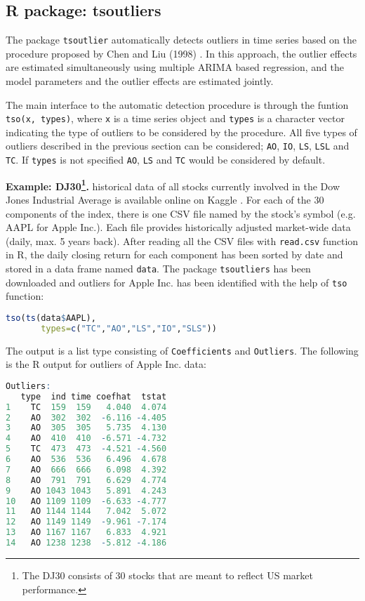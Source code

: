 \subsection{R package: tsoutliers} The package \verb|tsoutlier| automatically detects outliers in time series based on the procedure proposed by Chen and Liu (1998) \cite{chenliu}. In this approach, the outlier effects are estimated simultaneously using multiple ARIMA based regression, and the model parameters and the outlier effects are estimated jointly. \par The main interface to the automatic detection procedure is through the funtion \verb|tso(x, types)|, where \verb|x| is a time series object and \verb|types| is a character vector indicating the type of outliers to be considered by the procedure. All five types of outliers described in the previous section can be considered; \verb|AO|, \verb|IO|, \verb|LS|, \verb|LSL| and \verb|TC|. If \verb|types| is not specified \verb|AO|, \verb|LS| and \verb|TC| would be considered by default. \par \textbf{Example: DJ30\footnote{The DJ30 consists of 30 stocks that are meant to reflect US market performance.}.} historical data of all stocks currently involved in the Dow Jones Industrial Average is available online on Kaggle \cite{dj30}. For each of the 30 components of the index, there is one CSV file named by the stock's symbol (e.g. AAPL for Apple Inc.). Each file provides historically adjusted market-wide data (daily, max. 5 years back). After reading all the CSV files with \verb|read.csv| function in R, the daily closing return for each component has been sorted by date and stored in a data frame named \verb|data|. The package \verb|tsoutliers| has been downloaded and outliers for Apple Inc. has been identified with the help of \verb|tso| function:
\begin{lstlisting}[language=R]
tso(ts(data$AAPL), 
       types=c("TC","AO","LS","IO","SLS"))
\end{lstlisting}
The output is a list type consisting of \verb|Coefficients| and \verb|Outliers|. The following is the R output for outliers of Apple Inc. data:
\begin{lstlisting}[language=R]
Outliers:
   type  ind time coefhat  tstat
1    TC  159  159   4.040  4.074
2    AO  302  302  -6.116 -4.405
3    AO  305  305   5.735  4.130
4    AO  410  410  -6.571 -4.732
5    TC  473  473  -4.521 -4.560
6    AO  536  536   6.496  4.678
7    AO  666  666   6.098  4.392
8    AO  791  791   6.629  4.774
9    AO 1043 1043   5.891  4.243
10   AO 1109 1109  -6.633 -4.777
11   AO 1144 1144   7.042  5.072
12   AO 1149 1149  -9.961 -7.174
13   AO 1167 1167   6.833  4.921
14   AO 1238 1238  -5.812 -4.186
\end{lstlisting}
